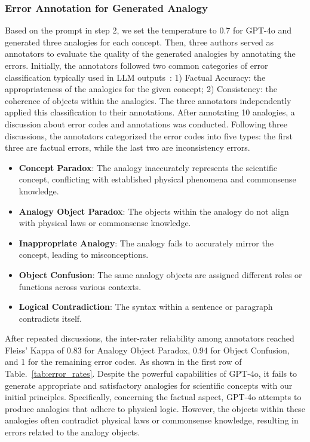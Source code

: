 \subsubsection{Error Annotation for Generated Analogy}
Based on the prompt in step 2, we set the temperature to 0.7 for GPT-4o and generated three analogies for each concept. Then, three authors served as annotators to evaluate the quality of the generated analogies by annotating the errors. Initially, the annotators followed two common categories of error classification typically used in LLM outputs~\cite{jang-etal-2022-becel,gekhman-etal-2023-trueteacher,chuang2024dola}: 1) Factual Accuracy: the appropriateness of the analogies for the given concept; 2) Consistency: the coherence of objects within the analogies. 
The three annotators independently applied this classification to their annotations. After annotating 10 analogies, a discussion about error codes and annotations was conducted. Following three discussions, the annotators categorized the error codes into five types: the first three are factual errors, while the last two are inconsistency errors.
\begin{itemize}
    \item \textbf{Concept Paradox}: The analogy inaccurately represents the scientific concept, conflicting with established physical phenomena and commonsense knowledge.
    \item \textbf{Analogy Object Paradox}: The objects within the analogy do not align with physical laws or commonsense knowledge.
    \item \textbf{Inappropriate Analogy}: The analogy fails to accurately mirror the concept, leading to misconceptions.
    \item \textbf{Object Confusion}: The same analogy objects are assigned different roles or functions across various contexts.
    \item \textbf{Logical Contradiction}: The syntax within a sentence or paragraph contradicts itself.
\end{itemize}

After repeated discussions, the inter-rater reliability among annotators reached Fleiss' Kappa of 0.83 for Analogy Object Paradox, 0.94 for Object Confusion, and 1 for the remaining error codes.
As shown in the first row of Table.~\ref{tab:error_rates}.
Despite the powerful capabilities of GPT-4o, it fails to generate appropriate and satisfactory analogies for scientific concepts with our initial principles. 
Specifically, concerning the factual aspect, GPT-4o attempts to produce analogies that adhere to physical logic. 
However, the objects within these analogies often contradict physical laws or commonsense knowledge, resulting in errors related to the analogy objects.


